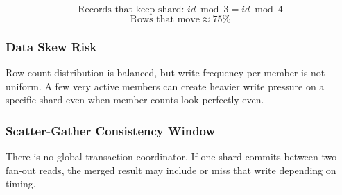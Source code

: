\documentclass[a4paper,12pt]{article}
\begin{document}
\[
\text{Records that keep shard: } id \bmod 3 = id \bmod 4
\]
\[
\text{Rows that move} \approx 75\%
\]

\subsubsection{Data Skew Risk}
\begin{tcolorbox}[warnbox]
Row count distribution is balanced, but write frequency per member is not uniform. A few very active members can create heavier write pressure on a specific shard even when member counts look perfectly even.
\end{tcolorbox}

\subsubsection{Scatter-Gather Consistency Window}
\begin{tcolorbox}[warnbox]
There is no global transaction coordinator. If one shard commits between two fan-out reads, the merged result may include or miss that write depending on timing.
\end{tcolorbox}
\end{document}
